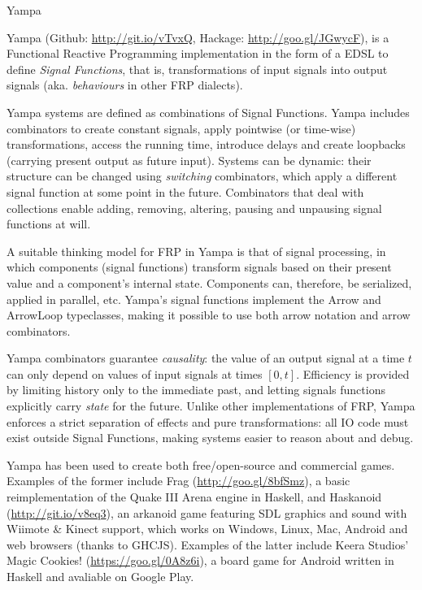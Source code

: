 \begin{hcarentry}[updated]{Yampa}
\label{yampa}
\makeheader

Yampa (Github: \href{http://git.io/vTvxQ}{http://git.io/vTvxQ}, Hackage:
\href{http://goo.gl/JGwycF}{http://goo.gl/JGwycF}), is a Functional Reactive
Programming implementation in the form of a EDSL to define \emph{Signal
Functions}, that is, transformations of input signals into output signals (aka.
\emph{behaviours} in other FRP dialects). 

Yampa systems are defined as combinations of Signal Functions.  Yampa includes
combinators to create constant signals, apply  pointwise (or time-wise)
transformations, access the running time, introduce delays and create loopbacks
(carrying present output as future input). Systems can be dynamic: their
structure can be changed using \emph{switching} combinators, which apply a
different signal function at some point in the future. Combinators that deal
with collections enable adding, removing, altering, pausing and unpausing
signal functions at will.

A suitable thinking model for FRP in Yampa is that of signal processing, in
which components (signal functions) transform signals based on their present
value and a component's internal state. Components can, therefore, be
serialized, applied in parallel, etc. Yampa's signal functions implement the
Arrow and ArrowLoop typeclasses, making it possible to use both arrow
notation and arrow combinators. 

Yampa combinators guarantee \emph{causality}: the value of an output signal at
a time $t$ can only depend on values of input signals at times $[0,t]$.
Efficiency is provided by limiting history only to the immediate past, and
letting signals functions explicitly carry \emph{state} for the future.  Unlike
other implementations of FRP, Yampa enforces a strict separation of effects and
pure transformations: all IO code must exist outside Signal Functions,
making systems easier to reason about and debug.

Yampa has been used to create both free/open-source and commercial games.
Examples of the former include Frag (\href{http://goo.gl/8bfSmz}{http://goo.gl/8bfSmz}), a basic
reimplementation of the Quake III Arena engine in Haskell, and Haskanoid
(\href{http://git.io/v8eq3}{http://git.io/v8eq3}), an arkanoid game featuring
SDL graphics and sound with Wiimote \& Kinect support, which works on Windows,
Linux, Mac, Android and web browsers (thanks to GHCJS). Examples of the latter
include Keera Studios' Magic Cookies!
(\href{https://goo.gl/0A8z6i}{https://goo.gl/0A8z6i}), a board game for Android
written in Haskell and avaliable on Google Play.


\end{hcarentry}
